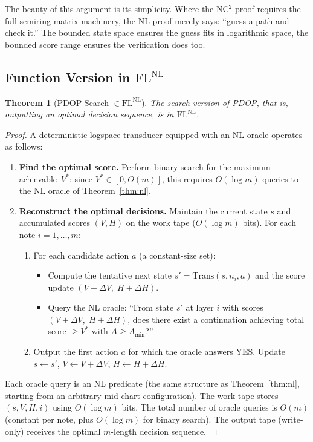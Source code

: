 \documentclass[11pt, letterpaper]{article}
\newtheorem{theorem}{Theorem}
\theoremstyle{definition}
\theoremstyle{remark}
\begin{document}
The beauty of this argument is its simplicity.
Where the NC$^2$ proof requires the full semiring-matrix machinery, the NL proof merely says: ``guess a path and check it.''
The bounded state space ensures the guess fits in logarithmic space, the bounded score range ensures the verification does too.

\subsection{Function Version in $\mathrm{FL^{NL}}$}

\begin{theorem}[PDOP Search $\in \mathrm{FL^{NL}}$]
\label{thm:flnl}
The search version of PDOP, that is, outputting an optimal decision sequence, is in $\mathrm{FL^{NL}}$.
\end{theorem}

\begin{proof}
A deterministic logspace transducer equipped with an NL oracle operates as follows:
\begin{enumerate}[leftmargin=*]
    \item \textbf{Find the optimal score.}
    Perform binary search for the maximum achievable~$V^*$:
    since $V^* \in [0, O(m)]$, this requires $O(\log m)$ queries to the NL oracle of Theorem~\ref{thm:nl}.

    \item \textbf{Reconstruct the optimal decisions.}
    Maintain the current state $s$ and accumulated scores $(V, H)$ on the work tape ($O(\log m)$ bits).
    For each note $i = 1, \ldots, m$:
    \begin{enumerate}[label=(\roman*)]
        \item For each candidate action $a$ (a constant-size set):
        \begin{itemize}
            \item Compute the tentative next state $s' = \mathrm{Trans}(s, n_i, a)$ and the score update $(V + \Delta V,\; H + \Delta H)$.
            \item Query the NL oracle: ``From state $s'$ at layer $i$ with scores $(V{+}\Delta V,\; H{+}\Delta H)$, does there exist a continuation achieving total score $\ge V^*$ with $A \ge A_{\min}$?''
        \end{itemize}
        \item Output the first action $a$ for which the oracle answers YES.
        Update $s \leftarrow s'$, $V \leftarrow V + \Delta V$, $H \leftarrow H + \Delta H$.
    \end{enumerate}
\end{enumerate}
Each oracle query is an NL predicate (the same structure as Theorem~\ref{thm:nl}, starting from an arbitrary mid-chart configuration).
The work tape stores $(s, V, H, i)$ using $O(\log m)$ bits.
The total number of oracle queries is $O(m)$ (constant per note, plus $O(\log m)$ for binary search).
The output tape (write-only) receives the optimal $m$-length decision sequence.
\end{proof}
\end{document}
